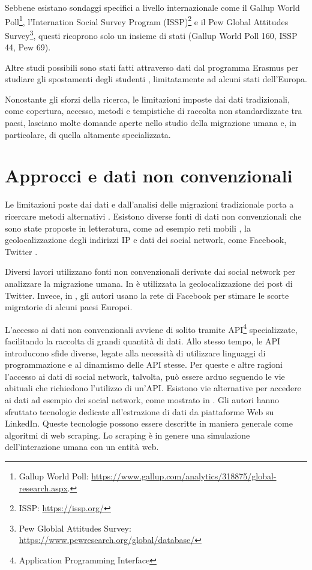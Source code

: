Sebbene esistano sondaggi specifici a livello internazionale come il Gallup World Poll\footnote{Gallup World Poll: \url{https://www.gallup.com/analytics/318875/global-research.aspx}.}, l'Internation Social Survey Program (ISSP)\footnote{ISSP: \url{https://issp.org/}} e il Pew Global Attitudes Survey\footnote{Pew Globlal Attitudes Survey: \url{https://www.pewresearch.org/global/database/}}, questi ricoprono solo un insieme di stati (Gallup World Poll 160, ISSP 44, Pew 69).

Altre studi possibili sono stati fatti attraverso dati dal programma Erasmus per studiare gli spostamenti degli studenti \cite{RodrguezGonzlez2011}, limitatamente ad alcuni stati dell'Europa.

Nonostante gli sforzi della ricerca, le limitazioni imposte dai dati tradizionali, come copertura, accesso, metodi e tempistiche di raccolta non standardizzate tra paesi, lasciano molte domande aperte nello studio della migrazione umana e, in particolare, di quella altamente specializzata.


\section{Approcci e dati non convenzionali} 
\label{DatiNonConvenzionali}
Le limitazioni poste dai dati e dall'analisi delle migrazioni tradizionale porta a ricercare metodi alternativi \cite{sirbu2021human}.
Esistono diverse fonti di dati non convenzionali che sono state proposte in letteratura, come ad esempio reti mobili \cite{inferringpatternsofJoshua, Gonz_lez_2008}, la geolocalizzazione degli indirizzi IP \cite{pitsillidishottotell} e dati dei social network, come Facebook, Twitter \cite{zagheniinferringintermigr, JRC112310}. 

Diversi lavori utilizzano fonti non convenzionali derivate dai social network per analizzare la migrazione umana. In \cite{zagheniinferringintermigr} è utilizzata
la geolocalizzazione dei post di Twitter. Invece, in  \cite{JRC112310}, gli autori usano la rete di Facebook per stimare le scorte migratorie di alcuni paesi Europei.


L'accesso ai dati non convenzionali avviene di solito tramite API\footnote{Application Programming Interface} specializzate, facilitando la raccolta di grandi quantità di dati. Allo stesso tempo, le API introducono sfide diverse, legate alla necessità di utilizzare linguaggi di programmazione e al dinamismo delle API stesse. Per queste e altre ragioni l'accesso ai dati di social network, talvolta, può essere arduo seguendo le vie abituali che richiedono l'utilizzo di un'API. Esistono vie alternative per accedere ai dati ad esempio dei social network, come mostrato in \cite{florentina2020web}. Gli autori hanno sfruttato tecnologie dedicate all'estrazione di dati da piattaforme Web su LinkedIn. Queste tecnologie possono essere descritte in maniera generale come algoritmi di web scraping. Lo scraping è in genere una simulazione dell'interazione umana con un entità web.  



